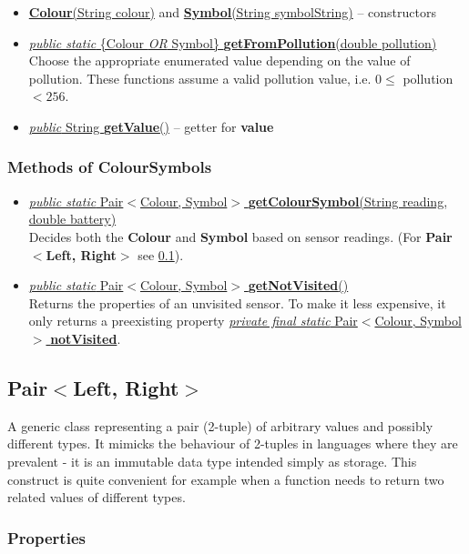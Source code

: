 \documentclass{article}
\newcommand{\method}[4]{\underline{\textit{#1} #2 \textbf{#3}(#4)}}
\newcommand{\prop}[3]{\underline{\textit{#1} #2 \textbf{#3}}}
\begin{document}
\begin{itemize}
\item \underline{\textbf{Colour}(String colour)} and \underline{\textbf{Symbol}(String symbolString)} -- constructors
\item \method{public static}{\{Colour \textit{OR} Symbol\}}{getFromPollution}{double pollution} \\
  Choose the appropriate enumerated value depending on the value of pollution. These functions assume a valid pollution value, i.e. $0\le$ pollution $<256$.
\item \method{public}{String}{getValue}{} -- getter for \textbf{value}
\end{itemize}

\subsubsection*{Methods of ColourSymbols}

\begin{itemize}
\item \method{public static}{Pair$<$Colour, Symbol$>$}{getColourSymbol}{String reading, double battery} \\
  Decides both the \textbf{Colour} and \textbf{Symbol} based on sensor readings. (For \textbf{Pair$<$Left, Right$>$} see \ref{cls:Pair}).
\item \method{public static}{Pair$<$Colour, Symbol$>$}{getNotVisited}{} \\
  Returns the properties of an unvisited sensor. To make it less expensive, it only returns a preexisting property \prop{private final static}{Pair$<$Colour, Symbol$>$}{notVisited}.
\end{itemize}


\subsection{Pair$<$Left, Right$>$}
\label{cls:Pair}

A generic class representing a pair (2-tuple) of arbitrary values and possibly different types. It mimicks the behaviour of 2-tuples in languages where they are prevalent - it is an immutable data type intended simply as storage. This construct is quite convenient for example when a function needs to return two related values of different types.

\subsubsection*{Properties}
\end{document}
